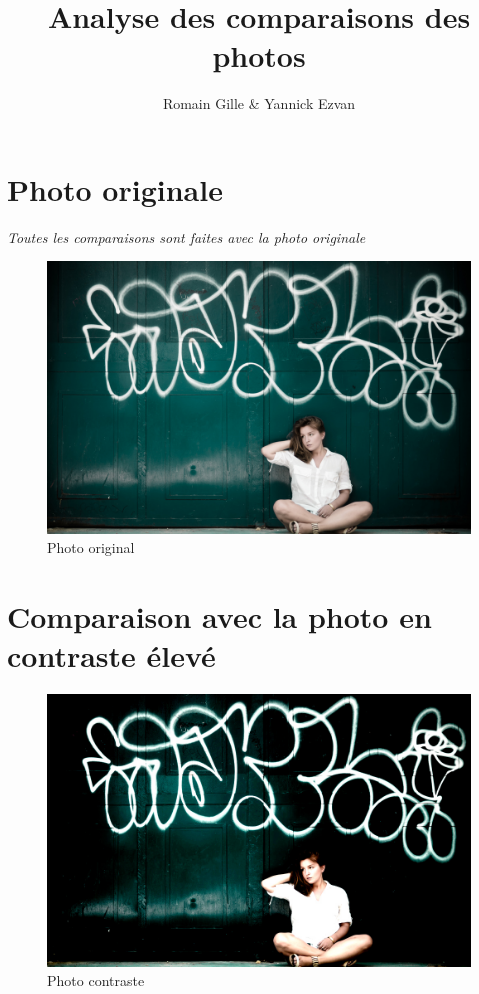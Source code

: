\documentclass[]{article}
\title{Analyse des comparaisons des photos}
\author{Romain Gille \& Yannick Ezvan}
\date{}
\begin{document}
\maketitle

{
\hypersetup{linkcolor=black}
\setcounter{tocdepth}{3}
\tableofcontents
}
\newpage

\section{Photo originale}\label{photo-originale}

\emph{Toutes les comparaisons sont faites avec la photo originale}

\begin{figure}[htbp]
\centering
\includegraphics{photos/original.jpg}
\caption{Photo original}
\end{figure}

\newpage

\section{Comparaison avec la photo en contraste
élevé}\label{comparaison-avec-la-photo-en-contraste-uxe9levuxe9}

\begin{figure}[htbp]
\centering
\includegraphics{photos/contraste.jpg}
\caption{Photo contraste}
\end{figure}
\end{document}
